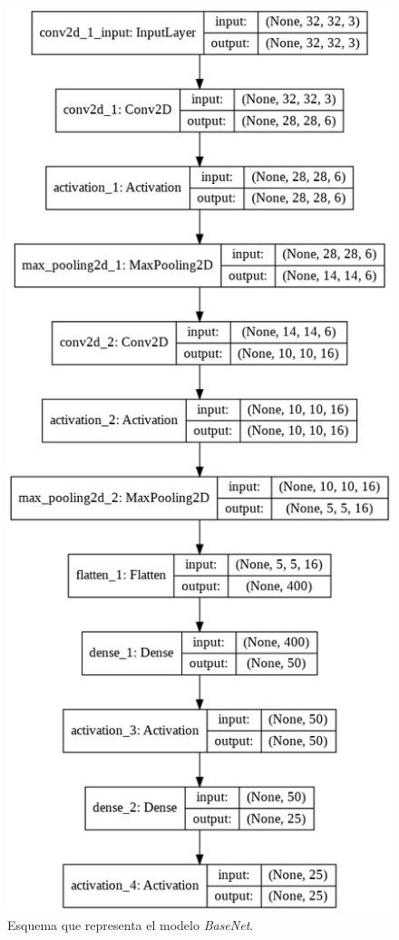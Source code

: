\documentclass[11pt,a4paper]{article}
\begin{document}
\begin{figure}[H]
  \centering
  \includegraphics[scale=0.28]{img/base-model.png}
  \caption{Esquema que representa el modelo \textit{BaseNet}.}
  \label{fig:base-model}
\end{figure}
\end{document}
